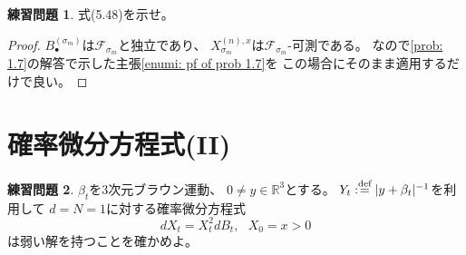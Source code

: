 \documentclass[uplatex]{jsarticle}
\theoremstyle{definition}
\newtheorem{prob}[prob]{練習問題}
\def\R{\mathbb{R}}
\def\mcF{\mathcal{F}}
\def\dfn{:\overset{\mbox{{\scriptsize def}}}{=}}
\begin{document}
\begin{prob}\label{prob: 5.8}
  式(5.48)を示せ。
\end{prob}

\begin{proof}
  \(B_\bullet^{(\sigma_m)}\)は\(\mcF_{\sigma_m}\)と独立であり、
  \(X_{\sigma_m}^{(n),x}\)は\(\mcF_{\sigma_m}\)-可測である。
  なので\autoref{prob: 1.7}の解答で示した主張\ref{enumi: pf of prob 1.7}を
  この場合にそのまま適用するだけで良い。
\end{proof}

















\newpage
\section{確率微分方程式(II)}
\label{section 6}


\begin{prob}\label{prob: 6.1}
  \(\beta_t\)を\(3\)次元ブラウン運動、
  \(0\neq y\in \R^3\)とする。
  \(Y_t \dfn |y+\beta_t|^{-1}\)を利用して
  \(d=N=1\)に対する確率微分方程式
  \[
  dX_t = X_t^2 dB_t, \ \ \ X_0 = x > 0
  \]
  は弱い解を持つことを確かめよ。
\end{prob}
\end{document}
